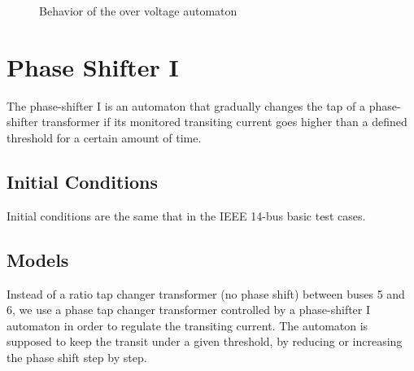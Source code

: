 \documentclass[a4paper, 12pt]{report}
\begin{document}
\begin{figure}[H]
\caption{Behavior of the over voltage automaton}
\end{figure}

\newpage
\section{Phase Shifter I}
\label{PhaseShifterIAutomaton}

The phase-shifter I is an automaton that gradually changes the tap of a phase-shifter transformer if its monitored transiting current goes higher than a defined threshold for a certain amount of time.

\subsection{Initial Conditions}

Initial conditions are the same that in the IEEE 14-bus basic test cases.

\subsection{Models}

Instead of a ratio tap changer transformer (no phase shift) between buses 5 and 6, we use a phase tap changer transformer controlled by a phase-shifter I automaton in order to regulate the transiting current.
The automaton is supposed to keep the transit under a given threshold, by reducing or increasing the phase shift step by step. \\
\end{document}
